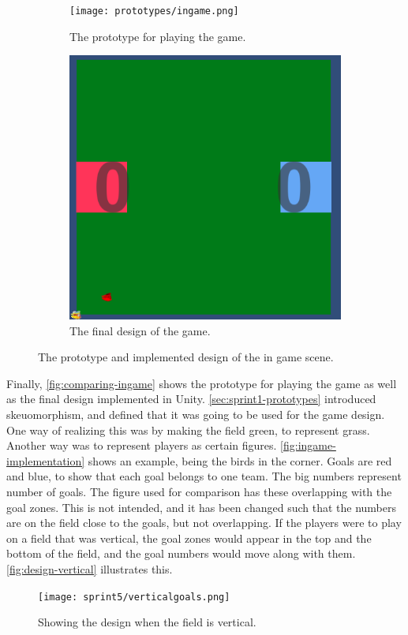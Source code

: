 \begin{figure}[H]
    \centering
    \begin{subfigure}{0.45\textwidth}
        \centering
        \texttt{[image: prototypes/ingame.png]}
        \caption{The prototype for playing the game.}
        \label{fig:ingame-prototype}
    \end{subfigure}
    \begin{subfigure}{0.45\textwidth}
        \centering
        \includegraphics[width=0.8\linewidth]{figures/sprint-4-game.PNG}
        \caption{The final design of the game.}
        \label{fig:ingame-implementation}
    \end{subfigure}
    \caption{The prototype and implemented design of the in game scene.}
    \label{fig:comparing-ingame}
\end{figure}
\noindent
Finally, \autoref{fig:comparing-ingame} shows the prototype for playing the game as well as the final design implemented in Unity.
\autoref{sec:sprint1-prototypes} introduced skeuomorphism, and defined that it was going to be used for the game design.
One way of realizing this was by making the field green, to represent grass.
Another way was to represent players as certain figures.
\autoref{fig:ingame-implementation} shows an example, being the birds in the corner.
Goals are red and blue, to show that each goal belongs to one team.
The big numbers represent number of goals.
The figure used for comparison has these overlapping with the goal zones.
This is not intended, and it has been changed such that the numbers are on the field close to the goals, but not overlapping.
If the players were to play on a field that was vertical, the goal zones would appear in the top and the bottom of the field, and the goal numbers would move along with them.
\autoref{fig:design-vertical} illustrates this.
\begin{figure}[H]
    \centering
    \texttt{[image: sprint5/verticalgoals.png]}
    \caption{Showing the design when the field is vertical.}
    \label{fig:design-vertical}
\end{figure}

